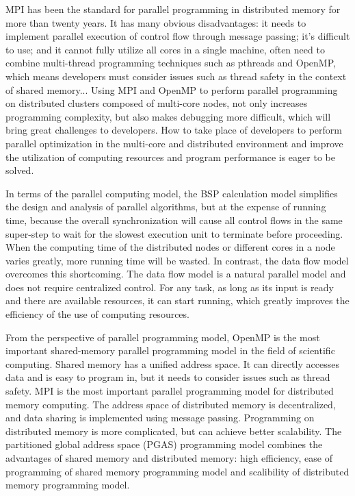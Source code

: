 MPI has been the standard for parallel programming in distributed memory for more than twenty years. It has many obvious disadvantages: it needs to implement parallel execution of control flow through message passing; it's difficult to use; and it cannot fully utilize all cores in a single machine, often need to combine multi-thread programming techniques such as pthreads and OpenMP, which means developers must consider issues such as thread safety in the context of shared memory... Using MPI and OpenMP to perform parallel programming on distributed clusters composed of multi-core nodes, not only increases programming complexity, but also makes debugging more difficult, which will bring great challenges to developers. How to take place of developers to perform parallel optimization in the multi-core and distributed environment and improve the utilization of computing resources and program performance is eager to be solved.

In terms of the parallel computing model, the BSP calculation model simplifies the design and analysis of parallel algorithms, but at the expense of running time, because the overall synchronization will cause all control flows in the same super-step to wait for the slowest execution unit to terminate before proceeding. When the computing time of the distributed nodes or different cores in a node varies greatly, more running time will be wasted. In contrast, the data flow model overcomes this shortcoming. The data flow model is a natural parallel model and does not require centralized control. For any task, as long as its input is ready and there are available resources, it can start running, which greatly improves the efficiency of the use of computing resources.

From the perspective of parallel programming model, OpenMP is the most important shared-memory parallel programming model in the field of scientific computing. Shared memory has a unified address space. It can directly accesses data and is easy to program in, but it needs to consider issues such as thread safety. MPI is the most important parallel programming model for distributed memory computing. The address space of distributed memory is decentralized, and data sharing is implemented using message passing. Programming on distributed memory is more complicated, but can achieve better scalability. The partitioned global address space (PGAS) programming model combines the advantages of shared memory and distributed memory: high efficiency, ease of programming of shared memory programming model and scalibility of distributed memory programming model.

